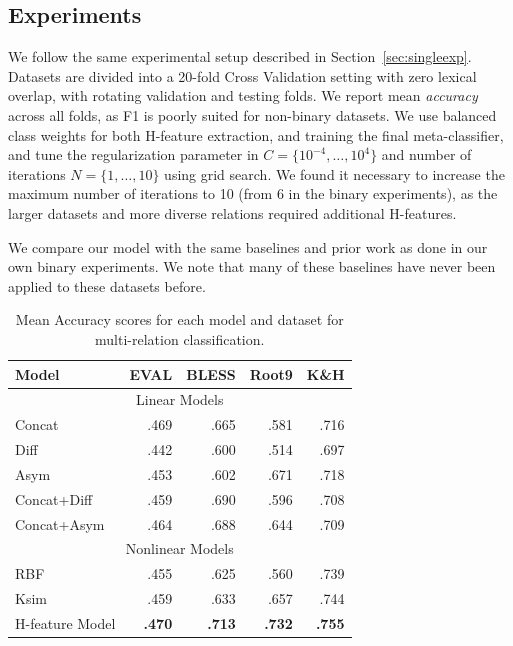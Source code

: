 \subsection{Experiments}

We follow the same experimental setup described in Section~\ref{sec:singleexp}.
Datasets are divided into a 20-fold Cross Validation setting with zero lexical
overlap, with rotating validation and testing folds. We report mean {\em
accuracy} across all folds, as F1 is poorly suited for non-binary datasets.
We use balanced class weights for both H-feature extraction, and training
the final meta-classifier, and tune the regularization parameter in
$C = \{10^{-4}, \ldots, 10^{4}\}$ and number of iterations $N = \{1, \ldots,
10\}$ using grid search. We found it necessary to increase the maximum number
of iterations to 10 (from 6 in the binary experiments), as the larger datasets
and more diverse relations required additional H-features.

We compare our model with the same baselines and prior work as done in our own
binary experiments. We note that many of these baselines have never been
applied to these datasets before.

\begin{table}
\centering
\begin{tabular}{|l|rrrr|}
  \hline
  {\bf Model}      & {\bf EVAL}  & {\bf BLESS} & {\bf Root9} & {\bf K\&H}  \\
  \hline
  \hline
  \multicolumn{5}{|c|}{Linear Models}\\
  \hline
  Concat           &      .469   &      .665   &      .581     &      .716   \\
  Diff             &      .442   &      .600   &      .514     &      .697   \\
  Asym             &      .453   &      .602   &      .671     &      .718   \\
  Concat+Diff      &      .459   &      .690   &      .596     &      .708   \\
  Concat+Asym      &      .464   &      .688   &      .644     &      .709   \\
  \hline
  \multicolumn{5}{|c|}{Nonlinear Models}\\
  \hline
  RBF              &      .455   &      .625   &      .560     &      .739   \\
  Ksim             &      .459   &      .633   &      .657     &      .744   \\
  H-feature Model  &  {\bf.470}  &  {\bf.713}  &  {\bf.732}    &  {\bf.755}  \\
  \hline
\end{tabular}
\caption{Mean Accuracy scores for each model and dataset for multi-relation classification.}
\label{tab:multiresults}
\end{table}

